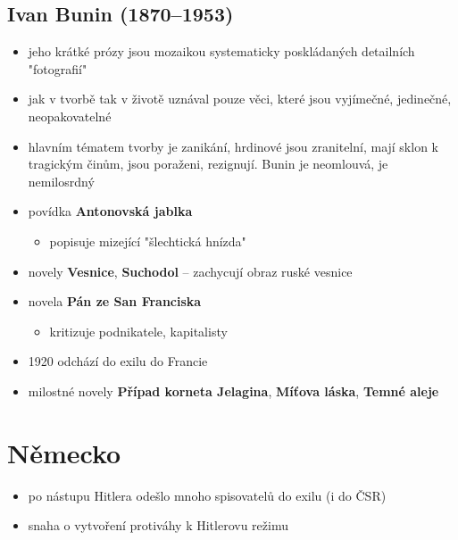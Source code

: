 \subsection{Ivan Bunin (1870--1953)}
\begin{itemize}
\item jeho krátké prózy jsou mozaikou systematicky poskládaných detailních "fotografií" 
\item jak v tvorbě tak v životě uznával pouze věci, které jsou vyjímečné, jedinečné, neopakovatelné
\item hlavním tématem tvorby je zanikání, hrdinové jsou zranitelní, mají sklon k tragickým činům, jsou poraženi, rezignují. Bunin je neomlouvá, je nemilosrdný
\item povídka \textbf{Antonovská jablka}
	\begin{itemize}
	\item popisuje mizející "šlechtická hnízda" 
	\end{itemize}
\item novely \textbf{Vesnice}, \textbf{Suchodol} -- zachycují obraz ruské vesnice
\item novela \textbf{Pán ze San Franciska}
	\begin{itemize}
	\item kritizuje podnikatele, kapitalisty
	\end{itemize}
\item 1920 odchází do exilu do Francie
\item milostné novely \textbf{Případ korneta Jelagina}, \textbf{Míťova láska}, \textbf{Temné aleje}

\end{itemize}

\section{Německo}
\begin{itemize}
\item po nástupu Hitlera odešlo mnoho spisovatelů do exilu (i do ČSR)
\item snaha o vytvoření protiváhy k Hitlerovu režimu
\end{itemize}

